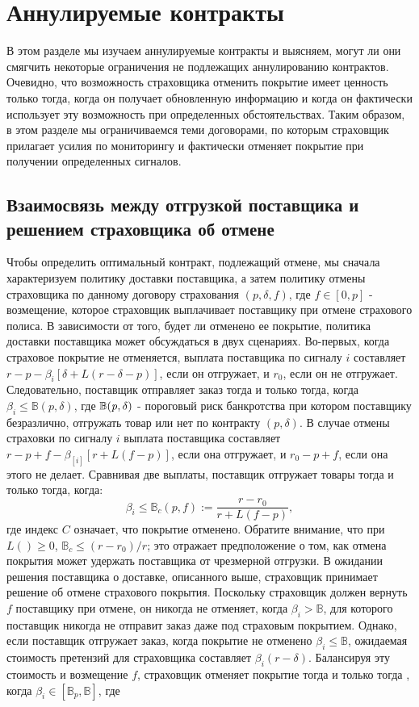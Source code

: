 \documentclass[a4paper,12pt]{article}
\begin{document}
\section{Аннулируемые контракты}
В этом разделе мы изучаем аннулируемые контракты и выясняем, могут ли они смягчить некоторые ограничения не подлежащих аннулированию контрактов. Очевидно, что возможность страховщика отменить покрытие имеет ценность только тогда, когда он получает обновленную информацию и когда он фактически использует эту возможность при определенных обстоятельствах. Таким образом, в этом разделе мы ограничиваемся теми договорами, по которым страховщик прилагает усилия по мониторингу и фактически отменяет покрытие при получении определенных сигналов.
\subsection{Взаимосвязь между отгрузкой поставщика и решением страховщика об отмене}
Чтобы определить оптимальный контракт, подлежащий отмене, мы сначала характеризуем политику доставки поставщика, а затем политику отмены страховщика по данному договору страхования $(p, \delta, f)$, где $f \in [0,p]$ - возмещение, которое страховщик выплачивает поставщику при отмене страхового полиса.
В зависимости от того, будет ли отменено ее покрытие, политика доставки поставщика может обсуждаться в двух сценариях. Во-первых, когда страховое покрытие не отменяется, выплата поставщика по сигналу $i$ составляет $r-p-\beta_{i}[\delta +L(r - \delta - p)]$, если он отгружает, и $r_{0}$, если он не отгружает. Следовательно, поставщик отправляет заказ тогда и только тогда, когда $\beta_{i} \leq \mathbb{B}(p, \delta)$, где $\mathbb{B}(\it{p}, \delta)$ - пороговый риск банкротства при котором поставщику безразлично, отгружать товар или нет по контракту $(p, \delta)$.
В случае отмены страховки по сигналу $i$ выплата поставщика составляет $r-p+f-\beta_[i][r+L(f-p)]$, если она отгружает, и $r_{0}-p+f$, если она этого не делает. Сравнивая две выплаты, поставщик отгружает товары тогда и только тогда, когда:
\begin{equation}
	\beta_{i} \leq \mathbb{B}_{c}(p,f):= \frac{r-r_{0}}{r+L(f - p)},
\end{equation}
где индекс $C$ означает, что покрытие отменено. Обратите внимание, что при $L() \geq 0$, $\mathbb{B}_{c} \leq (r - r_{0})/r$; это отражает предположение о том, как отмена покрытия может удержать поставщика от чрезмерной отгрузки.
В ожидании решения поставщика о доставке, описанного выше, страховщик принимает решение об отмене страхового покрытия. Поскольку страховщик должен вернуть $f$ поставщику при отмене, он никогда не отменяет, когда $\beta_{i} > \mathbb{B}$, для которого поставщик никогда не отправит заказ даже под страховым покрытием. Однако, если поставщик отгружает заказ, когда покрытие не отменено $\beta_{i} \leq  \mathbb{B}$, ожидаемая стоимость претензий для страховщика составляет $\beta_{i}(r - \delta)$. Балансируя эту стоимость и возмещение $f$, страховщик отменяет покрытие тогда и только тогда , когда $\beta_{i} \in [\mathbb{B}_{p}, \mathbb{B}]$, где
\end{document}
